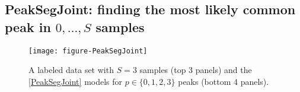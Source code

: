 \documentclass{article} %
\DeclareMathOperator*{\argmin}{arg\,min}
\begin{document}
  



\subsection{PeakSegJoint: finding the most likely common peak in
  $0,\dots, S$ samples}

\begin{figure}[b!]
  \centering
  \texttt{[image: figure-PeakSegJoint]}
  \vskip -0.5cm
  \caption{A labeled data set with $S=3$ samples (top 3 panels) and
    the \ref{PeakSegJoint} models for $p\in\{0, 1, 2, 3\}$ peaks
    (bottom 4 panels).
}
  \label{fig:PeakSegJoint}
\end{figure}
\end{document}
